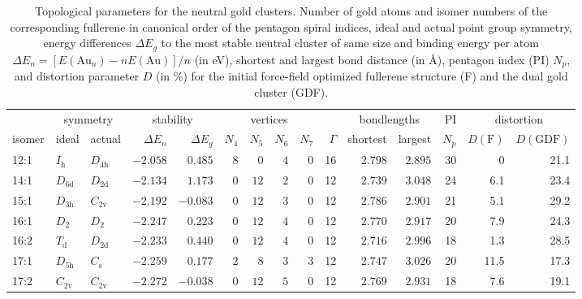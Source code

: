 \begin{table}[htbp]
	\centering
    \setlength{\tabcolsep}{1.5pt}
    \footnotesize{
    \caption{Topological parameters for the neutral gold clusters. Number of
    gold atoms and isomer numbers of the corresponding fullerene in canonical
    order of the pentagon spiral indices,\autocite{Fowler-atlas-2006} ideal and
    actual point group symmetry, energy differences $\Delta E_g$ to the most
    stable neutral cluster of same size and binding energy per atom $\Delta E_n
    = [E(\textrm{Au}_n)-nE(\textrm{Au})]/n$  (in eV), shortest and largest bond
    distance (in \AA), pentagon index (PI) $N_p$, and distortion parameter $D$
    (in \%) for the initial force-field optimized fullerene structure (F) and
    the dual gold cluster (GDF).}
	\label{tab:neutral}
	\begin{tabular}{lllrrrrrrrrrrrr}
\toprule
\multicolumn{1}{c}{  } & \multicolumn{2}{c}{ symmetry  }  & \multicolumn{2}{c}{stability} & \multicolumn{4}{c}{ vertices } & & \multicolumn{2}{c}{ bondlengths } &  PI & \multicolumn{2}{c}{ distortion } \\
isomer & ideal  & actual  & $\Delta E_n$ &$\Delta E_g$ & \multicolumn{1}{c}{$N_4$} & \multicolumn{1}{c}{$N_5$} & \multicolumn{1}{c}{$N_6$} & \multicolumn{1}{c}{$N_7$} & $\Gamma$ & shortest & largest  & $N_p$ & $D(\textrm{F})$ & $D(\textrm{GDF})$\\\midrule
12:1    & $I_\mathrm{h}$  & $D_\mathrm{4h}$ & $-2.058$ & $0.485$  & $8$ & $0$  & $4$      & $0$ & 16  & $2.798$ & $2.895$ & 30  & 0    & 21.1  \\
14:1    & $D_\mathrm{6d}$ & $D_\mathrm{2d}$ & $-2.134$ & $1.173$  & $0$ & $12$ & $2$      & $0$ & 12  & $2.739$ & $3.048$ & 24  & 6.1  & 23.4  \\
15:1    & $D_\mathrm{3h}$ & $C_\mathrm{2v}$ & $-2.192$ & $-0.083$ & $0$ & $12$ & $3$      & $0$ & 12  & $2.786$ & $2.901$ & 21  & 5.1  & 29.2  \\
16:1    & $D_\mathrm{2}$  & $D_\mathrm{2 }$ & $-2.247$ & $0.223$  & $0$ & $12$ & $4$      & $0$ & 12  & $2.770$ & $2.917$ & 20  & 7.9  & 24.3  \\
16:2    & $T_\mathrm{d}$  & $D_\mathrm{2d}$ & $-2.233$ & $0.440$  & $0$ & $12$ & $4$      & $0$ & 12  & $2.716$ & $2.996$ & 18  & 1.3  & 28.5  \\
17:1    & $D_\mathrm{5h}$ & $C_\mathrm{s}$    & $-2.259$ & $0.177$  & $2$ & $8$  & $3$      & $3$ & 12  & $2.747$ & $3.026$ & 20  & 11.5 & 17.3  \\
17:2    & $C_\mathrm{2v}$ & $C_\mathrm{2v}$ & $-2.272$ & $-0.038$ & $0$ & $12$ & $5$      & $0$ & 12  & $2.769$ & $2.931$ & 18  & 7.6  & 19.1  \\

\end{tabular}}
\end{table}
